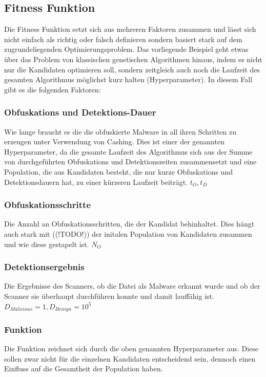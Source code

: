 \subsection{Fitness Funktion}
Die Fitness Funktion setzt sich aus mehreren Faktoren zusammen und lässt sich nicht einfach als richtig oder falsch definieren sondern basiert stark auf dem zugrundeliegenden Optimierungsproblem. Das vorliegende Beispiel geht etwas über das Problem von klassischen genetischen Algorithmen hinaus, indem es nicht nur die Kandidaten optimieren soll, sondern zeitgleich auch noch die Laufzeit des gesamten Algorithmus möglichst kurz halten (Hyperparameter).
In diesem Fall gibt es die folgenden Faktoren:

\subsubsection{Obfuskations und Detektions-Dauer}
Wie lange braucht es die die obfuskierte Malware in all ihren Schritten zu erzeugen unter Verwendung von Cashing. Dies ist einer der genannten Hyperparameter, da die gesamte Laufzeit des Algorithmus sich aus der Summe von durchgeführten Obfuskations und Detektionszeiten zusammensetzt und eine Population, die aus Kandidaten besteht, die nur kurze Obfuskations und Detektionsdauern hat, zu einer kürzeren Laufzeit beiträgt. $t_O,  t_D$
\subsubsection{Obfuskationsschritte}
Die Anzahl an Obfuskationsschritten, die der Kandidat behinhaltet. Dies hängt auch stark mit ((!TODO!)) der initalen Population von Kandidaten zusammen und wie diese gestapelt ist. $N_O$
\subsubsection{Detektionsergebnis}
Die Ergebnisse des Scanners, ob die Datei als Malware erkannt wurde und ob der Scanner sie überhaupt durchführen konnte und damit lauffähig ist. $D_{Malicious}=1, D_{Benign}=10^5$

\subsubsection{Funktion}
Die Funktion zeichnet sich durch die oben genannten Hyperparameter aus. Diese sollen zwar nicht für die einzelnen Kandidaten entscheidend sein, dennoch einen Einfluss auf die Gesamtheit der Population haben.

